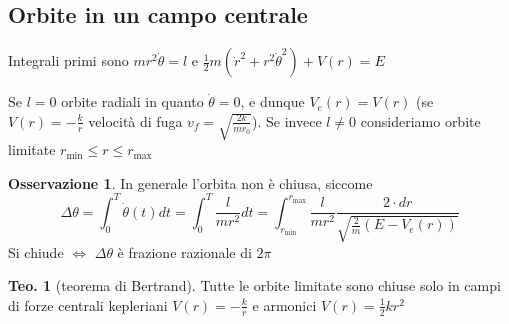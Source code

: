 \documentclass[a4paper,10pt]{article}
\theoremstyle{definition}
\theoremstyle{indentdefinition}
\theoremstyle{indenttheorem}
\newtheorem{thm}{Teo.}
\theoremstyle{myremark}
\newtheorem*{rem*}{Osservazione}
\theoremstyle{indentgeneral}
\begin{document}
\subsection{Orbite in un campo centrale}

Integrali primi sono $mr^{2}\dot{\theta}=l$ e $\frac{1}{2}m\left(\dot{r}^{2}+r^{2}\dot{\theta}^{2}\right)+V\left(r\right)=E$

Se $l=0$ orbite radiali in quanto $\dot{\theta}=0$, e dunque $V_{e}\left(r\right)=V\left(r\right)$
(se $V\left(r\right)=-\frac{k}{r}$ velocità di fuga $v_{f}=\sqrt{\frac{2k}{mr_{0}}}$).
Se invece $l\neq0$ consideriamo orbite limitate $r_{\min}\leq r\leq r_{\max}$
\begin{rem*}
In generale l'orbita non è chiusa, siccome 
\[
\Delta\theta=\int_{0}^{T}\dot{\theta}\left(t\right)dt=\int_{0}^{T}\frac{l}{mr^{2}}dt=\int_{r_{\min}}^{r_{\max}}\frac{l}{mr^{2}}\frac{2\cdot dr}{\sqrt{\frac{2}{m}\left(E-V_{e}\left(r\right)\right)}}
\]
Si chiude $\iff$ $\Delta\theta$ è frazione razionale di $2\pi$
\end{rem*}
\begin{thm}[teorema di Bertrand]
Tutte le orbite limitate sono chiuse solo in campi di forze centrali
kepleriani $V\left(r\right)=-\frac{k}{r}$ e armonici $V\left(r\right)=\frac{1}{2}kr^{2}$
\end{thm}
\end{document}
